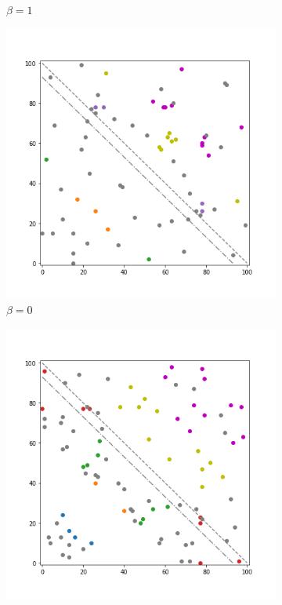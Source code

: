 \begin{figure}[!hb]
\begin{subfigure}{.3\textwidth}
    	\caption{$\beta=1$}
    	\label{fig:24}
	\end{subfigure}
	\begin{subfigure}{.3\textwidth}%
    	\centering
    	\includegraphics[width=1\linewidth]{Bilder/simulation_2_5}
    	\caption{$\beta=0$}
    	\label{fig:25}
	\end{subfigure}%
	\begin{subfigure}{.3\textwidth}%
    	\centering
    	\includegraphics[width=1\linewidth]{Bilder/simulation_3_5}

\end{subfigure}
\end{figure}
